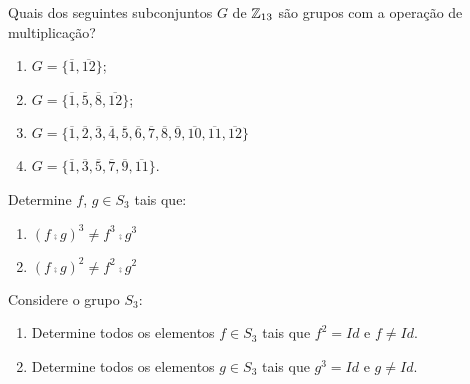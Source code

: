 \documentclass[12pt]{article}
\begin{document}
\questao Quais dos seguintes subconjuntos $G$ de $\mathbb{Z}_{13}$ s{\~a}o grupos
com a opera{\c c}{\~a}o de multiplica{\c c}{\~a}o?
\begin{multicols}{2}
\begin{enumerate}[label=({\alph*})]
\item $G=\{\overline{1},\overline{12}\}$;

\item $G=\{\overline{1},\overline{5},\overline{8},\overline{12}\}$;

\item $G=\{\overline{1},\overline{2},\overline{3},\overline{4}, \overline{5},\overline{6},\overline{7},
 \overline{8},\overline{9},\overline{10},\overline{11},\overline{12}\}$
\item $G=\{\overline{1}, \overline{3},\overline{5},\overline{7},\overline{9},\overline{11}\}$.
\end{enumerate}
\end{multicols}

\vesp

\questao Determine $f$, $g \in S_3$ tais que:
\begin{enumerate}[label=({\alph*})]
	\item $(f \comp g)^3 \ne f^3\comp g^3$
	\item $(f \comp g)^2 \ne f^2\comp g^2$
\end{enumerate}

\vesp

\questao Considere o grupo $S_3$:
\begin{enumerate}[label=({\alph*})]
	\item Determine todos os elementos $f \in S_3$ tais que $f^2 = Id$ e $f \ne Id$.
	\item Determine todos os elementos $g \in S_3$ tais que $g^3 = Id$ e $g \ne Id$.
\end{enumerate}

\vesp
\end{document}
